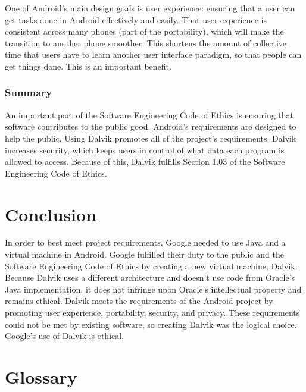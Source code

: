 \documentclass[11pt]{article}
\begin{document}
\begin{multicols}{2}
One of Android's main design goals is user experience: ensuring that a user can
get tasks done in Android effectively and easily.  That user experience is
consistent across many phones (part of the portability), which will make the
transition to another phone smoother.  This shortens the amount of collective
time that users have to learn another user interface paradigm, so that people
can get things done.  This is an important benefit.


\subsubsection{Summary} %
\label{ssub:public-summary}

An important part of the Software Engineering Code of Ethics is ensuring that
software contributes to the public good.  Android's requirements are designed to
help the public.  Using Dalvik promotes all of the project's requirements.
Dalvik increases security, which keeps users in control of what data each
program is allowed to access.  Because of this, Dalvik fulfills Section 1.03 of
the Software Engineering Code of Ethics.




\section{Conclusion} %
\label{sec:conclusion}

In order to best meet project requirements, Google needed to use Java and a
virtual machine in Android.  Google fulfilled their duty to the public and the
Software Engineering Code of Ethics by creating a new virtual machine, Dalvik.
Because Dalvik uses a different architecture and doesn't use code from Oracle's
Java implementation, it does not infringe upon Oracle's intellectual property
and remains ethical.  Dalvik meets the requirements of the Android project by
promoting user experience, portability, security, and privacy.  These
requirements could not be met by existing software, so creating Dalvik was the
logical choice.  Google's use of Dalvik is ethical.


\appendix

\section{Glossary} %
\label{sec:glossary}


\end{multicols}
\end{document}
